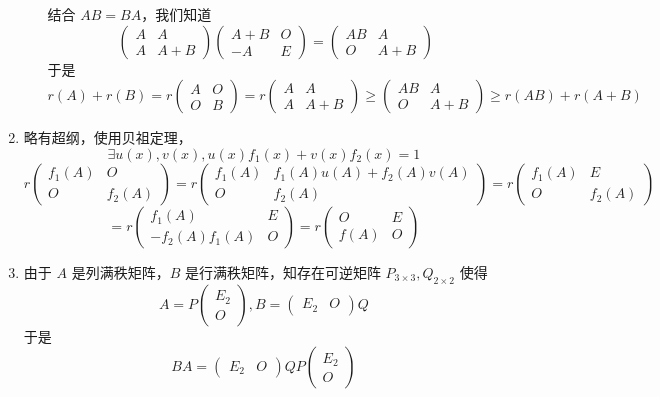 \begin{enumerate}
\begin{enumerate}
    结合 $AB=BA$，我们知道
    \[\begin{pmatrix}A & A \\ A & A+B\end{pmatrix}\begin{pmatrix}A+B & O \\ -A & E\end{pmatrix}=\begin{pmatrix}AB & A \\ O & A+B\end{pmatrix}\]
    于是
    \[r(A)+r(B)=r\begin{pmatrix}A & O \\ O & B\end{pmatrix}=r\begin{pmatrix}A & A \\ A & A+B\end{pmatrix}\ge \begin{pmatrix}AB & A \\ O & A+B\end{pmatrix}\ge r(AB)+r(A+B)\] 
    \end{enumerate}
    \item 略有超纲，使用贝祖定理，
    \[\exists u(x),v(x),u(x)f_1(x)+v(x)f_2(x)=1\]
    \[r\begin{pmatrix}f_1(A) & O \\ O & f_2(A)\end{pmatrix}=r\begin{pmatrix}f_1(A) & f_1(A)u(A)+f_2(A)v(A) \\ O & f_2(A)\end{pmatrix}=r\begin{pmatrix}f_1(A) & E \\ O & f_2(A)\end{pmatrix}\] 
    \[=r\begin{pmatrix}f_1(A) & E \\ -f_2(A)f_1(A) & O\end{pmatrix}=r\begin{pmatrix}O & E \\ f(A) & O\end{pmatrix}\]
    \item 由于 $A$ 是列满秩矩阵，$B$ 是行满秩矩阵，知存在可逆矩阵 $P_{3\times 3},Q_{2\times 2}$ 使得
    \[A=P\begin{pmatrix}E_2 \\ O\end{pmatrix},B=\begin{pmatrix}E_2 & O\end{pmatrix}Q\]
    于是 \[BA=\begin{pmatrix}E_2 & O\end{pmatrix}QP\begin{pmatrix}E_2 \\ O\end{pmatrix}\]

\end{enumerate}
